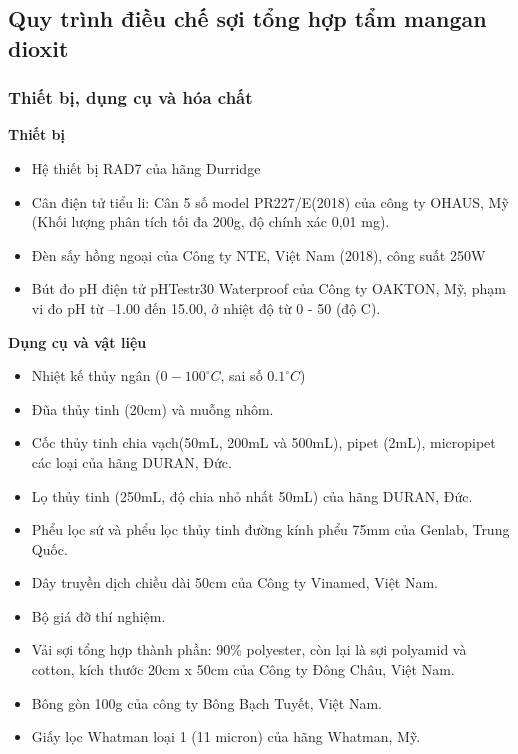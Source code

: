  

 
\subsection{Quy trình điều chế sợi tổng hợp tẩm mangan dioxit}
       
\subsubsection{Thiết bị, dụng cụ và hóa chất}
   
    \textbf{Thiết bị}
        \begin{itemize}
            \item Hệ thiết bị RAD7 của hãng Durridge
            \item Cân điện tử tiểu li: Cân 5 số model PR227/E(2018) của công ty OHAUS, Mỹ (Khối lượng phân tích tối đa 200g, độ chính xác 0,01 mg).
            \item Đèn sấy hồng ngoại của Công ty NTE, Việt Nam (2018), công suất 250W
            \item Bút đo pH điện tử pHTestr30 Waterproof của Công ty OAKTON,  Mỹ, phạm vi đo pH từ –1.00 đến 15.00, ở nhiệt độ từ 0 - 50 (độ C).
            
        \end{itemize}

    \textbf{Dụng cụ và vật liệu}
        \begin{itemize}
            \item Nhiệt kế thủy ngân ($0-100 ^\circ C$, sai số $0.1 ^\circ C$)
            \item Đũa thủy tinh (20cm) và muỗng nhôm.
            \item Cốc thủy tinh chia vạch(50mL, 200mL và 500mL), pipet (2mL), micropipet các  loại của hãng DURAN, Đức.
            \item Lọ thủy tinh (250mL, độ chia nhỏ nhất 50mL) của hãng DURAN, Đức.
            \item Phểu lọc sứ và phểu lọc thủy tinh đường kính phểu 75mm của Genlab, Trung Quốc.
            \item Dây truyền dịch chiều dài 50cm của Công ty Vinamed, Việt Nam.
            \item Bộ giá đỡ thí nghiệm.
            \item Vải sợi tổng hợp thành phần: 90\% polyester, còn lại là sợi polyamid và cotton, kích thước 20cm x 50cm của Công ty Đông Châu, Việt Nam.
            \item Bông gòn 100g của công ty Bông Bạch Tuyết, Việt Nam.
            \item Giấy lọc Whatman loại 1 (11 micron) của hãng Whatman, Mỹ.
        \end{itemize}

